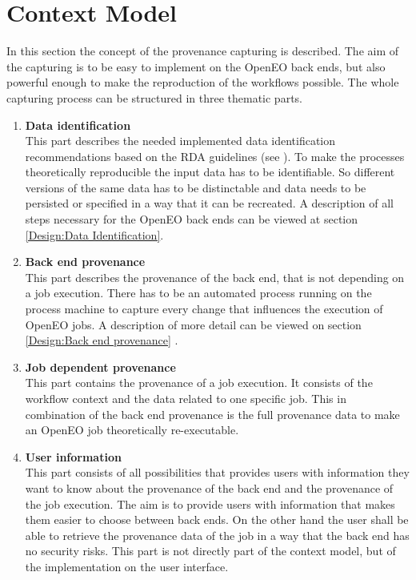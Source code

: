 \documentclass[draft,final]{vutinfth} %
\begin{document}
\section{Context Model}\label{Design:Context Model}
In this section the concept of the provenance capturing is described. The aim of the capturing is to be easy to implement on the OpenEO back ends, but also powerful enough to make the reproduction of the workflows possible. The whole capturing process can be structured in three thematic parts.

\begin{enumerate}
	\item \textbf{Data identification} \\
	This part describes the needed implemented data identification recommendations based on the RDA guidelines (see \cite{rauber2016identification}). To make the processes theoretically reproducible the input data has to be identifiable. So different versions of the same data has to be distinctable and data needs to be persisted or specified in a way that it can be recreated. A description of all steps necessary for the OpenEO back ends can be viewed at section \ref{Design:Data Identification}.
	\item \textbf{Back end provenance} \\
	This part describes the provenance of the back end, that is not depending on a job execution. There has to be an automated process running on the process machine to capture every change that influences the execution of OpenEO jobs. A description of more detail can be viewed on section \ref{Design:Back end provenance} .     
	\item\textbf{Job dependent provenance} \\
	This part contains the provenance of a job execution. It consists of the workflow context and the data related to one specific job. This in combination of the back end provenance is the full provenance data to make an OpenEO job theoretically re-executable.   
	\item \textbf{User information} \\
	This part consists of all possibilities that provides users with information they want to know about the provenance of the back end and the provenance of the job execution. The aim is to provide users with information that makes them easier to choose between back ends. On the other hand the user shall be able to retrieve the provenance data of the job in a way that the back end has no security risks. This part is not directly part of the context model, but of the implementation on the user interface. 
\end{enumerate}
\end{document}
